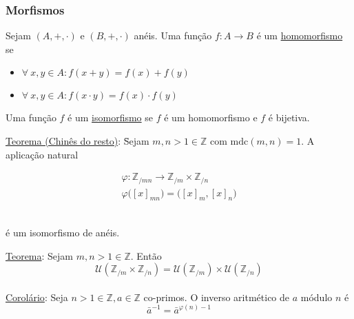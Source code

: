 \documentclass{article}
\begin{document}
\subsubsection{Morfismos}
Sejam $(A, +, \cdot)$ e $(B, +, \cdot)$ anéis. Uma função $f: A \to B$ é um \uline{homomorfismo} se
\begin{itemize}
  \item $\forall\: x,y \in A: f(x+y) = f(x) + f(y)$
  \item $\forall\: x,y \in A: f(x \cdot y) = f(x) \cdot f(y)$
\end{itemize}
\vspace{5pt}
Uma função $f$ é um \uline{isomorfismo} se $f$ é um homomorfismo e $f$ é bijetiva. \\[5pt]
\begin{tabbing}
  \uline{Teorema (Chinês do resto)}: \= Sejam $m,n > 1 \in \mathbb{Z}$ com $\text{mdc}(m,n) = 1$. A aplicação natural \\[-5pt]
  \begin{minipage}{\linewidth}
    \begin{gather*}
      \varphi: \mathbb{Z}_{/mn} \to \mathbb{Z}_{/m} \times \mathbb{Z}_{/n} \\
      \varphi \big( {[x]}_{mn} \big) = \big( {[x]}_{m}, {[x]}_{n} \big)
    \end{gather*}
  \end{minipage} \\[10pt]
  \> é um isomorfismo de anéis.
\end{tabbing}
\vspace{10pt}
\uline{Teorema}: Sejam $m,n > 1 \in \mathbb{Z}$. Então
\[ \mathcal{U} \left( \mathbb{Z}_{/m} \times \mathbb{Z}_{/n} \right) = \mathcal{U} \left( \mathbb{Z}_{/m} \right) \times \mathcal{U} \left( \mathbb{Z}_{/n} \right) \]
\\
\uline{Corolário}: Seja $n > 1 \in \mathbb{Z}, a \in \mathbb{Z}$ co-primos. O inverso aritmético de $a$ módulo $n$ é
\[ \bar{a}^{-1} = \bar{a}^{\varphi(n) - 1} \]
\end{document}
